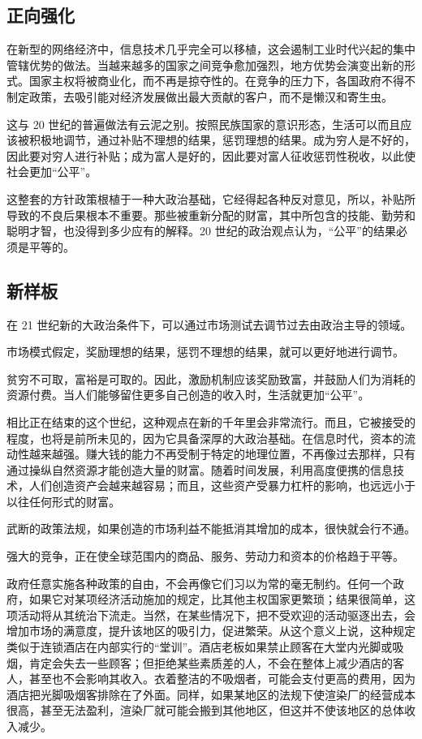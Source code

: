 \subsection{正向强化}
在新型的网络经济中，信息技术几乎完全可以移植，这会遏制工业时代兴起的集中管辖优势的做法。当越来越多的国家之间竞争愈加强烈，地方优势会演变出新的形式。国家主权将被商业化，而不再是掠夺性的。在竞争的压力下，各国政府不得不制定政策，去吸引能对经济发展做出最大贡献的客户，而不是懒汉和寄生虫。

这与 20 世纪的普遍做法有云泥之别。按照民族国家的意识形态，生活可以而且应该被积极地调节，通过补贴不理想的结果，惩罚理想的结果。成为穷人是不好的，因此要对穷人进行补贴；成为富人是好的，因此要对富人征收惩罚性税收，以此使社会更加“公平”。

这整套的方针政策根植于一种大政治基础，它经得起各种反对意见，所以，补贴所导致的不良后果根本不重要。那些被重新分配的财富，其中所包含的技能、勤劳和聪明才智，也没得到多少应有的解释。20 世纪的政治观点认为，“公平”的结果必须是平等的。

\subsection{新样板}
在 21 世纪新的大政治条件下，可以通过市场测试去调节过去由政治主导的领域。

市场模式假定，奖励理想的结果，惩罚不理想的结果，就可以更好地进行调节。

贫穷不可取，富裕是可取的。因此，激励机制应该奖励致富，并鼓励人们为消耗的资源付费。当人们能够留住更多自己创造的收入时，生活就更加“公平”。

相比正在结束的这个世纪，这种观点在新的千年里会非常流行。而且，它被接受的程度，也将是前所未见的，因为它具备深厚的大政治基础。在信息时代，资本的流动性越来越强。赚大钱的能力不再受制于特定的地理位置，不再像过去那样，只有通过操纵自然资源才能创造大量的财富。随着时间发展，利用高度便携的信息技术，人们创造资产会越来越容易；而且，这些资产受暴力杠杆的影响，也远远小于以往任何形式的财富。

武断的政策法规，如果创造的市场利益不能抵消其增加的成本，很快就会行不通。

强大的竞争，正在使全球范围内的商品、服务、劳动力和资本的价格趋于平等。

政府任意实施各种政策的自由，不会再像它们习以为常的毫无制约。任何一个政府，如果它对某项经济活动施加的规定，比其他主权国家更繁琐；结果很简单，这项活动将从其统治下流走。当然，在某些情况下，把不受欢迎的活动驱逐出去，会增加市场的满意度，提升该地区的吸引力，促进繁荣。从这个意义上说，这种规定类似于连锁酒店在内部实行的“堂训”。酒店老板如果禁止顾客在大堂内光脚或吸烟，肯定会失去一些顾客；但拒绝某些素质差的人，不会在整体上减少酒店的客人，甚至也不会影响其收入。衣着整洁的不吸烟者，可能会支付更高的费用，因为酒店把光脚吸烟客排除在了外面。同样，如果某地区的法规下使渲染厂的经营成本很高，甚至无法盈利，渲染厂就可能会搬到其他地区，但这并不使该地区的总体收入减少。

